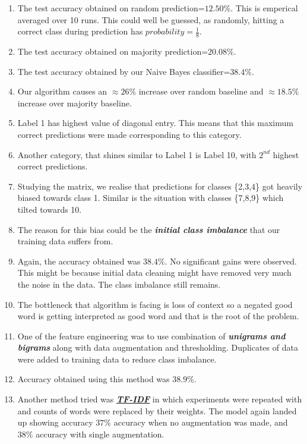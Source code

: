 \documentclass{article}
\newcommand{\italb}[1]{\textbf{\textit{#1}}}
\begin{document}
\begin{enumerate}
\item The test accuracy obtained on random prediction=$12.50\%.$ This is emperical averaged over 10 runs. This could well be guessed, as randomly, hitting a correct class during prediction has $probability=\frac{1}{8}$.
\item The test accuracy obtained on majority prediction=$20.08\%.$
\item The test accuracy obtained by our Naive Bayes classifier=$38.4\%$.
\item Our algorithm causes an $\approx26\%$ increase over random baseline and $\approx18.5\%$ increase over majority baseline.
\item Label 1 has highest value of diagonal entry. This means that this maximum correct predictions were made corresponding to this category.
\item Another category, that shines similar to Label 1 is Label 10, with $2^{nd}$ highest correct predictions.
\item  Studying the matrix, we realise that predictions for classes \{2,3,4\} got heavily biased towards class 1. Similar is the situation with classes \{7,8,9\} which tilted towards 10.
\item The reason for this bias could be the \italb{initial class imbalance} that our training data suffers from. 
\item Again, the accuracy obtained was $38.4\%$. No significant gains were observed. This might be because initial data cleaning might have removed very much the noise in the data. The class imbalance still remains. 
\item The bottleneck that algorithm is facing is loss of context so a negated good word is getting interpreted as good word and that is the root of the problem.
\item One of the feature engineering was to use combination of \italb{unigrams and bigrams} along with data augmentation and thresholding. Duplicates of data were added to training data to reduce class imbalance.
\item Accuracy obtained using this method was $38.9\%$.
\item Another method tried was \href{https://towardsdatascience.com/document-feature-extraction-and-classification-53f0e813d2d3}{\italb{TF-IDF}} in which experiments were repeated with and counts of words were replaced by their weights. The model again landed up showing accuracy $37\%$ accuracy when no augmentation was made, and $38\%$ accuracy with single augmentation.


\end{enumerate}
\end{document}
